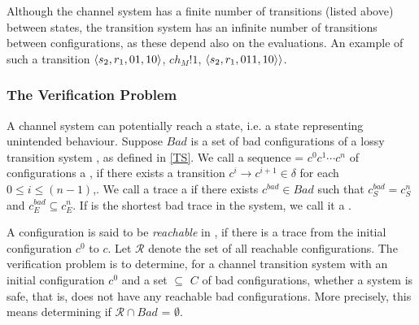 Although the channel system has a finite number of transitions (listed above) between states, the transition system has an infinite number of transitions between configurations, as these depend also on the evaluations. An example of such a transition $\langle s_2,r_1,01,10\rangle$, $ch_M!1$, $\langle s_2,r_1,011,10\rangle\rangle$.

\subsubsection{The Verification Problem}
A channel system can potentially reach a  state, i.e. a state representing unintended behaviour. Suppose $Bad$ is a set of bad configurations of a lossy transition system , as defined in \ref{TS}. We call a sequence  = $c^0c^1\cdots c^n$ of configurations a , if there exists a transition $c^i \rightarrow c^{i+1} \in \delta$ for each $0 \leq i \leq (n-1)$,. We call a trace a  if there exists $c^{bad} \in Bad$ such that $c^{bad}_S = c^n_S$ and $c^{bad}_E \subseteq c^{n}_E$. If  is the shortest bad trace in the system, we call it a .

A configuration  is said to be \emph{reachable} in , if there is a trace from the initial configuration $c^0$ to $c$. Let $\mathcal{R}$ denote the set of all reachable configurations. The verification problem is to determine, for a channel transition system  with an initial configuration $c^0$ and a set  $\subseteq$ $C$ of bad configurations, whether a system is safe, that is, does not have any reachable bad configurations. More precisely, this means determining if $\mathcal{R} \cap Bad$ = $\emptyset$.







